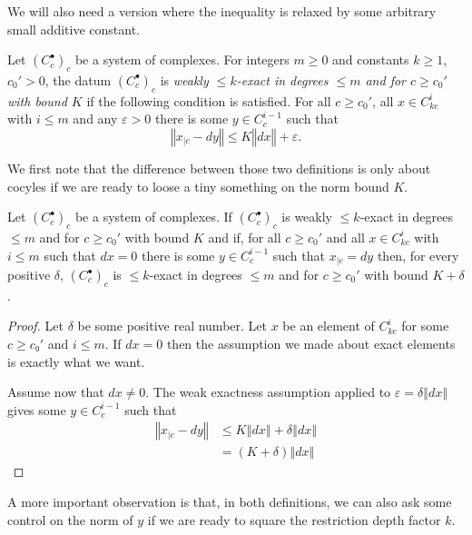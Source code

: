 We will also need a version where the inequality is relaxed by some arbitrary small additive constant.

\begin{definition}
  \label{is_weak_bounded_exact}
  \leanok
  Let $(C_c^\bullet)_c$ be a system of complexes.
  For integers $m\geq 0$ and constants $k \ge 1$, $c_0'>0$,
  the datum $(C_c^\bullet)_c$ is
  \emph{weakly $\leq k$-exact in degrees $\leq m$ and for $c\geq c_0'$ with bound $K$} if the following condition is satisfied.
  For all $c\geq c_0'$, all $x\in C_{kc}^i$ with $i\leq m$ and any $ε > 0$
  there is some $y\in C_c^{i-1}$ such that
  \[
    ‖x_{|c} - dy‖ ≤ K ‖dx‖ + ε.
  \]
\end{definition}

We first note that the difference between those two definitions is only about cocyles if we are ready to loose
a tiny something on the norm bound $K$.

\begin{lemma}
  \label{is_bounded_exact_of_weakly}
  Let $(C_c^\bullet)_c$ be a system of complexes. If $(C_c^\bullet)_c$ is
  weakly $\leq k$-exact in degrees $\leq m$ and for $c\geq c_0'$ with bound $K$ and if,
  for all $c\geq c_0'$ and all $x\in C_{kc}^i$ with $i\leq m$ such that $dx = 0$
  there is some $y\in C_c^{i-1}$  such that
  $x_{|c} = dy$ then, for every positive $δ$,
  $(C_c^\bullet)_c$ is $\leq k$-exact in degrees $\leq m$ and for $c\geq c_0'$ with
  bound $K + δ$.
\end{lemma}

\begin{proof}
  Let $δ$ be some positive real number.
  Let $x$ be an element of $C_{kc}^i$ for some $c ≥ c₀'$ and $i ≤ m$. If $dx = 0$
  then the assumption we made about exact elements is exactly what we want.

  Assume now that $dx ≠ 0$. The weak exactness assumption applied to $ε = δ‖dx‖$
  gives some $y\in C_c^{i-1}$ such that
  \begin{align*}
    ‖x_{|c} - dy‖ &≤ K‖dx‖ + δ‖dx‖ \\
                  &= (K + δ)‖dx‖
  \end{align*}
\end{proof}

A more important observation is that, in both definitions, we can also ask some
control on the norm of $y$ if we are ready to square the restriction depth factor $k$.

